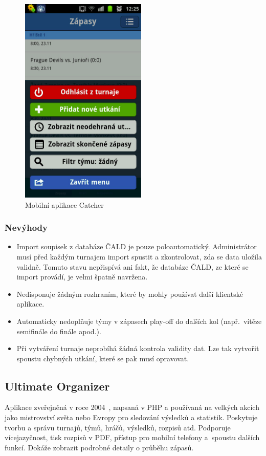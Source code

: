 \begin{figure}[ht!]
\centering
\includegraphics[width=60mm]{./images/catcher.png}
\caption{Mobilní aplikace Catcher~\cite{catcher_play}\label{overflow}}
\label{fig:uwsgi}
\end{figure}

\subsubsection*{Nevýhody}
\begin{itemize}
  \item Import soupisek z databáze ČALD je pouze poloautomatický. Administrátor musí před každým turnajem
    import spustit a zkontrolovat, zda se data uložila validně. Tomuto stavu nepřispívá ani fakt,
    že databáze ČALD, ze které se import provádí, je velmi špatně navržena.
  \item Nedisponuje žádným rozhraním, které by mohly používat další klientské aplikace.
  \item Automaticky nedoplňuje týmy v zápasech play-off do dalších kol (např.~vítěze semifinále do finále apod.).
  \item Při vytváření turnaje neprobíhá žádná kontrola validity dat.
    Lze tak vytvořit spoustu chybných utkání, které se pak musí opravovat. 
\end{itemize}

\subsection*{Ultimate Organizer}

Aplikace zveřejněná v roce 2004~\cite{ultimate_organizer}, napsaná v PHP a používaná na velkých akcích jako mistrovství světa nebo Evropy
pro sledování výsledků a statistik. Poskytuje tvorbu a správu turnajů, týmů, hráčů,
výsledků, rozpisů atd. Podporuje vícejazyčnost, tisk rozpisů v PDF, přístup pro mobilní telefony
a~spoustu dalších funkcí. Dokáže zobrazit podrobné detaily o průběhu zápasů.

